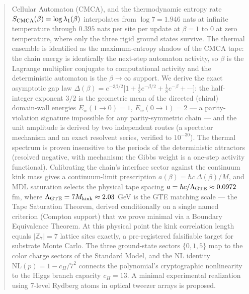 \documentclass[11pt]{article}
\theoremstyle{remark}
\begin{document}
\begin{abstract}
Cellular Automaton (CMCA), and the
thermodynamic entropy rate $S_{\rm CMCA}(\beta) = \log \lambda_1(\beta)$
interpolates from $\log 7 = 1.946$ nats at infinite temperature through
$0.395$ nats per site per update at $\beta = 1$ to $0$ at zero temperature,
where only the three rigid ground states survive. The thermal ensemble is
identified as the maximum-entropy shadow of the CMCA tape: the chain energy is
identically the next-step automaton activity, so $\beta$ is the Lagrange
multiplier conjugate to computational activity and the deterministic automaton
is the $\beta \to \infty$ support. We derive the exact asymptotic gap law
$\Delta(\beta) = e^{-3\beta/2}\bigl[1 + \tfrac{1}{2}e^{-\beta/2} +
\tfrac{1}{8}e^{-\beta} + \cdots\bigr]$: the half-integer exponent $3/2$ is the
geometric mean of the directed (chiral) domain-wall energies
$E_w(1{\to}0) = 1$, $E_w(0{\to}1) = 2$ --- a parity-violation signature
impossible for any parity-symmetric chain --- and the unit amplitude is derived
by two independent routes (a spectator mechanism and an exact resolvent series,
verified to $10^{-30}$). The thermal spectrum is proven insensitive to the
periods of the deterministic attractors (resolved negative, with mechanism:
the Gibbs weight is a one-step activity functional). Calibrating the chain's
interface sector against the continuum kink mass gives a continuum-limit
prescription $a(\beta) = \hbar c\,\Delta(\beta)/M$, and MDL saturation
selects the physical tape spacing
$a = \hbar c/\Lambda_{\rm GTE} \approx 0.0972$ fm, where
$\Lambda_{\rm GTE} = 7 M_{\rm kink} \approx 2.03$ GeV is the GTE matching
scale --- the Tape Saturation Theorem, derived conditionally on a single named
criterion (Compton support) that we prove minimal via a Boundary Equivalence
Theorem. At this physical point the kink correlation length equals
$|\mathbb{Z}_7| = 7$ lattice sites exactly, a pre-registered falsifiable
target for substrate Monte Carlo. The three ground-state sectors
$\{0, 1, 5\}$ map to the color charge sectors of the Standard Model, and the
NL identity $\mathrm{NL}(p) = 1 - c_H/7^2$ connects the polynomial's
cryptographic nonlinearity to the Higgs branch capacity $c_H = 13$. A minimal
experimental realization using 7-level Rydberg atoms in optical tweezer arrays
is proposed.
\end{abstract}

\tableofcontents
\newpage
\end{document}
